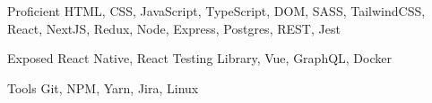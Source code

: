 
\begin{cvskills}
  \cvskill
    {Proficient} %
    {HTML, CSS, JavaScript, TypeScript, DOM, SASS, TailwindCSS, React, NextJS, Redux, Node, Express, Postgres, REST, Jest} %

  \cvskill
    {Exposed} %
    {React Native, React Testing Library, Vue, GraphQL, Docker} %

  \cvskill
    {Tools} %
    {Git, NPM, Yarn, Jira, Linux} %
\end{cvskills}
